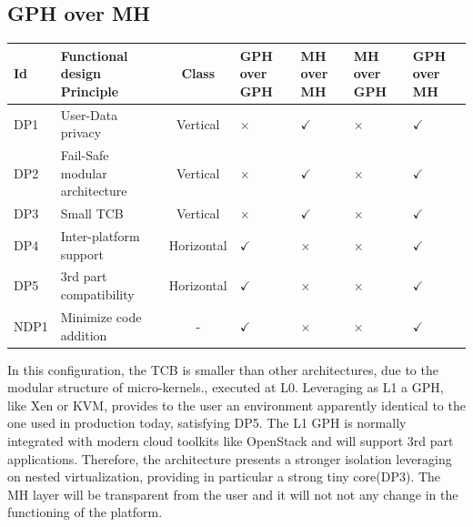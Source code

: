 \documentclass{sig-alternate}
\begin{document}
\subsection{GPH over MH}

\label{par:gom}

\begin{table}
\label{fin:conf}
\centering
\begin{tabular}{llcllll}
\toprule
Id & Functional design Principle & Class & GPH over GPH & MH over MH & MH over GPH & GPH over MH\\
\midrule
DP1 & User-Data privacy & Vertical & $\times$  & $\checkmark$ & $\times $ & $\checkmark$ \\
      DP2 & Fail-Safe modular architecture & Vertical & $\times$  & $\checkmark$ & $\times$ & $\checkmark$ \\
   DP3 & Small TCB & Vertical &  $\times$& $\checkmark$ & $\times$ & $\checkmark$ \\
   DP4 & Inter-platform support & Horizontal & $\checkmark$  & $\times$ & $\times$ & $\checkmark$ \\
   DP5 & 3rd part compatibility & Horizontal & $\checkmark$  & $\times$ & $\times$ & $\checkmark$ \\
   NDP1 & Minimize code addition & - & $\checkmark$  & $\times$ & $\times$ & $\checkmark$ \\
\bottomrule
      \end{tabular}
\end{table}

In this configuration, the TCB is smaller than other architectures, due to the modular structure of micro-kernels., executed at L0. Leveraging as L1 a GPH, like Xen or KVM, provides to the user an environment apparently  identical to the one used in production today, satisfying DP5. The L1 GPH is normally integrated with modern cloud toolkits like OpenStack and will support 3rd part applications.
Therefore, the architecture presents a stronger isolation leveraging on nested virtualization, providing in particular a strong tiny core(DP3). The MH layer will be transparent from the user and it will not not any change in the functioning of the platform.
\end{document}
